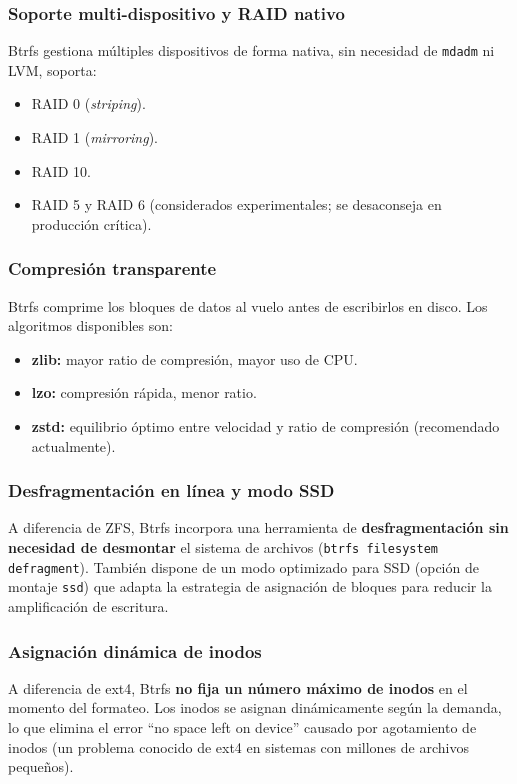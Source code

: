 \documentclass[12pt,letterpaper]{article}
\begin{document}
\subsubsection{Soporte multi-dispositivo y RAID nativo}
Btrfs gestiona múltiples dispositivos de forma nativa, sin necesidad de \texttt{mdadm} ni LVM, soporta:
\begin{itemize}
\item RAID 0 (\emph{striping}).
\item RAID 1 (\emph{mirroring}).
\item RAID 10.
\item RAID 5 y RAID 6 (considerados experimentales; se desaconseja en producción crítica).
\end{itemize}

\subsubsection{Compresión transparente}
Btrfs comprime los bloques de datos al vuelo antes de escribirlos en disco. Los algoritmos disponibles son:

\begin{itemize}
\item \textbf{zlib:} mayor ratio de compresión, mayor uso de CPU.
\item \textbf{lzo:} compresión rápida, menor ratio.
\item \textbf{zstd:} equilibrio óptimo entre velocidad y ratio de compresión (recomendado actualmente).
\end{itemize}

\subsubsection{Desfragmentación en línea y modo SSD}
A diferencia de ZFS, Btrfs incorpora una herramienta de \textbf{desfragmentación sin necesidad de desmontar} el
sistema de archivos (\texttt{btrfs filesystem defragment}). También dispone de un modo optimizado para SSD
(opción de montaje \texttt{ssd}) que adapta la estrategia de asignación de bloques para reducir la amplificación
de escritura.

\subsubsection{Asignación dinámica de inodos}
A diferencia de ext4, Btrfs \textbf{no fija un número máximo de inodos} en el momento del formateo. Los inodos se
asignan dinámicamente según la demanda, lo que elimina el error ``no space left on device'' causado por
agotamiento de inodos (un problema conocido de ext4 en sistemas con millones de archivos pequeños).
\end{document}
